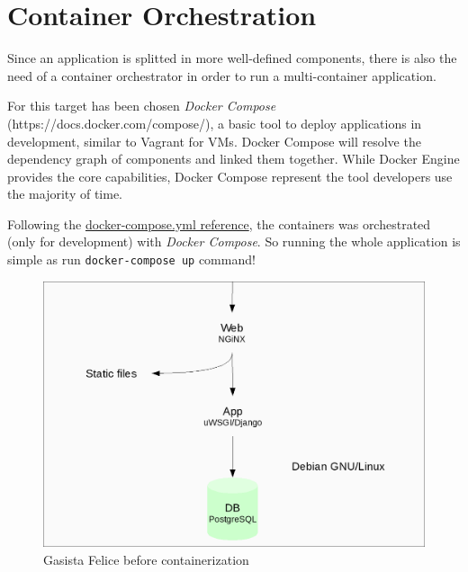 \section{Container Orchestration}\label{container-orchestration}

Since an application is splitted in more well-defined components, there is also the need of a container orchestrator in order to run a multi-container application.

For this target has been chosen \textit{Docker Compose}
(https://docs.docker.com/compose/), a basic tool to deploy applications
in development, similar to Vagrant for VMs. Docker Compose will resolve
the dependency graph of components and linked them together. While
Docker Engine provides the core capabilities, Docker Compose represent
the tool developers use the majority of time.

Following the \href{https://docs.docker.com/compose/yml/}{docker-compose.yml reference}, the containers was orchestrated
(only for development) with \textit{Docker Compose}. So running the whole
application is simple as run \texttt{docker-compose up} command!

\begin{figure}[htbp]
\centering
\includegraphics{media/ch3-gf_old.png}
\caption{Gasista Felice before containerization}
\end{figure}

